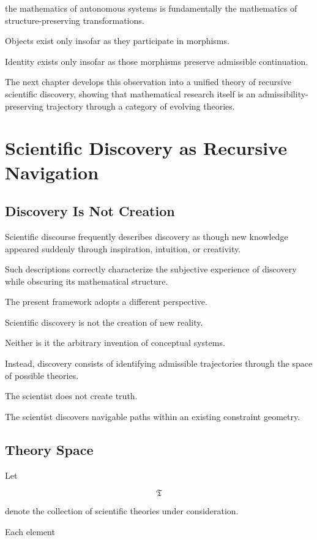 \documentclass[11pt,oneside]{book}
\numberwithin{equation}{chapter}
\theoremstyle{definition}
\theoremstyle{plain}
\begin{document}
the mathematics of autonomous systems is fundamentally the mathematics of
structure-preserving transformations.

Objects exist only insofar as they participate in morphisms.

Identity exists only insofar as those morphisms preserve admissible
continuation.

The next chapter develops this observation into a unified theory of recursive
scientific discovery, showing that mathematical research itself is an
admissibility-preserving trajectory through a category of evolving theories.

\chapter{Scientific Discovery as Recursive Navigation}

\section{Discovery Is Not Creation}

Scientific discourse frequently describes discovery as though new knowledge
appeared suddenly through inspiration, intuition, or creativity.

Such descriptions correctly characterize the subjective experience of
discovery while obscuring its mathematical structure.

The present framework adopts a different perspective.

Scientific discovery is not the creation of new reality.

Neither is it the arbitrary invention of conceptual systems.

Instead, discovery consists of identifying admissible trajectories through
the space of possible theories.

The scientist does not create truth.

The scientist discovers navigable paths within an existing constraint
geometry.

\section{Theory Space}

Let

\[
\mathfrak{T}
\]

denote the collection of scientific theories under consideration.

Each element
\end{document}
